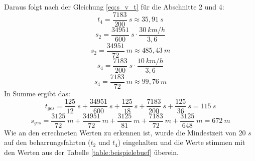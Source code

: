 Daraus folgt nach der Gleichung \ref{eq:s_v_t} für die Abschnitte 2 und 4:
\[t_{4} = \frac{7183}{200}\:s \approx 35,91\:s\]
\[s_{2} = \frac{34951}{600}\:s \cdot \frac{30\:km/h}{3,6}\]
\[s_{2} = \frac{34951}{72}\:m \approx 485,43\:m\]
\[s_{4} = \frac{7183}{200}\:s \cdot \frac{10\:km/h}{3,6}\]
\[s_{4} = \frac{7183}{72}\:m \approx 99,76\:m\]
In Summe ergibt das:
\[t_{ges} = \frac{125}{12}\:s + \frac{34951}{600}\:s + \frac{125}{18}\:s + \frac{7183}{200}\:s + \frac{125}{36}\:s = 115\:s\]
\[s_{ges} = \frac{3125}{72}\:m + \frac{34951}{72}\:m + \frac{3125}{81}\:m + \frac{7183}{72}\:m + \frac{3125}{648}\:m = 672\:m\]
Wie an den errechneten Werten zu erkennen ist, wurde die Mindestzeit von 20 $s$ auf den \Gls{beharrungsfahrt}en ($t_2$ und $t_4$) eingehalten und die Werte stimmen mit den Werten aus der Tabelle \ref{table:beispielebuef} überein.